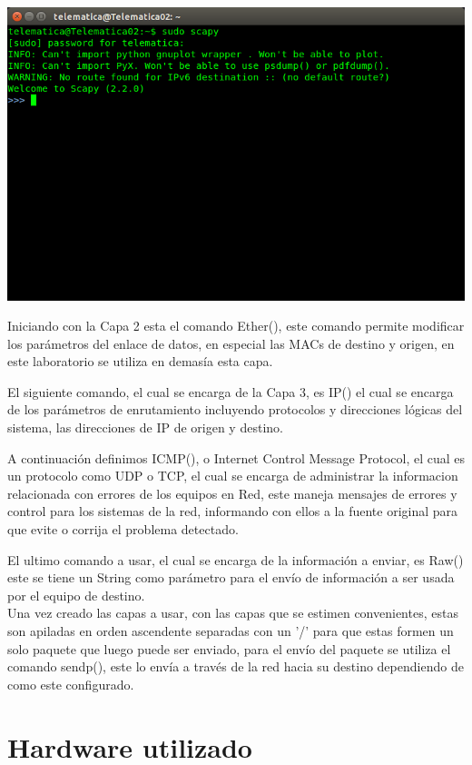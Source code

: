\documentclass[spanish]{udpreport}
\begin{document}
\begin{center}
	\includegraphics[scale=.37]{imagenes/Scapy_Init.png}
\end{center}

Iniciando con la Capa 2 esta el comando Ether(), este comando permite modificar los parámetros del enlace de datos, en especial las MACs de destino y origen, en este laboratorio se utiliza en demasía esta capa.


El siguiente comando, el cual se encarga de la Capa 3, es IP() el cual se encarga de los parámetros de enrutamiento incluyendo protocolos y direcciones lógicas del sistema, las direcciones de IP de origen y destino.


A continuación definimos ICMP(), o Internet Control Message Protocol, el cual es un protocolo como UDP o TCP, el cual se encarga de administrar la informacion relacionada con errores de los equipos en Red, este maneja mensajes de errores y control para los sistemas de la red, informando con ellos a la fuente original para que evite o corrija el problema detectado.

El ultimo comando a usar, el cual se encarga de la información a enviar, es Raw() este se tiene un String como parámetro para el envío de información a ser usada por el equipo de destino.
\\

Una vez creado las capas a usar, con las capas que se estimen convenientes, estas son apiladas en orden ascendente separadas con un '/' para que estas formen un solo paquete que luego puede ser enviado, para el envío del paquete se utiliza el comando sendp(), este lo envía a través de la red hacia su destino dependiendo de como este configurado.


\section{Hardware utilizado}
\end{document}
